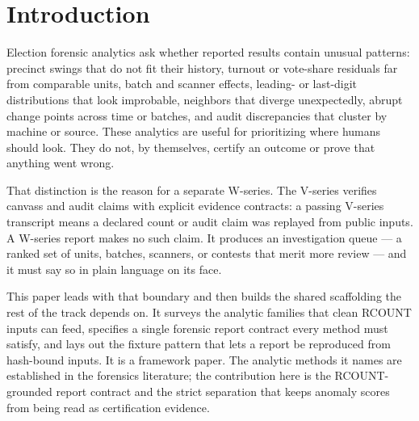 \section{Introduction}

Election forensic analytics ask whether reported results contain unusual
patterns: precinct swings that do not fit their history, turnout or vote-share
residuals far from comparable units, batch and scanner effects, leading- or
last-digit distributions that look improbable, neighbors that diverge
unexpectedly, abrupt change points across time or batches, and audit
discrepancies that cluster by machine or source. These analytics are useful for
prioritizing where humans should look. They do not, by themselves, certify an
outcome or prove that anything went wrong.

That distinction is the reason for a separate W-series. The V-series verifies
canvass and audit claims with explicit evidence contracts: a passing V-series
transcript means a declared count or audit claim was replayed from public
inputs. A W-series report makes no such claim. It produces an investigation
queue --- a ranked set of units, batches, scanners, or contests that merit more
review --- and it must say so in plain language on its face.

This paper leads with that boundary and then builds the shared scaffolding the
rest of the track depends on. It surveys the analytic families that clean RCOUNT
inputs can feed, specifies a single forensic report contract every method must
satisfy, and lays out the fixture pattern that lets a report be reproduced from
hash-bound inputs. It is a framework paper. The analytic methods it names are
established in the forensics literature; the contribution here is the
RCOUNT-grounded report contract and the strict separation that keeps anomaly
scores from being read as certification evidence.
